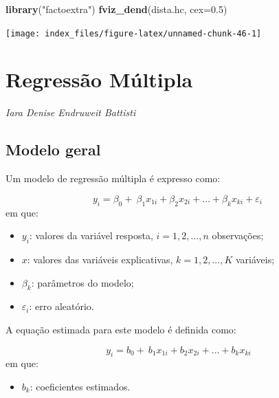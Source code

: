 \documentclass[12pt,brazil,oneside]{book}
\newenvironment{Shaded}{\begin{snugshade}}{\end{snugshade}}
\newcommand{\DataTypeTok}[1]{\textcolor[rgb]{0.13,0.29,0.53}{#1}}
\newcommand{\FloatTok}[1]{\textcolor[rgb]{0.00,0.00,0.81}{#1}}
\newcommand{\KeywordTok}[1]{\textcolor[rgb]{0.13,0.29,0.53}{\textbf{#1}}}
\newcommand{\NormalTok}[1]{#1}
\newcommand{\StringTok}[1]{\textcolor[rgb]{0.31,0.60,0.02}{#1}}
\providecommand{\tightlist}{%
  \setlength{\itemsep}{0pt}\setlength{\parskip}{0pt}}
\begin{document}
\begin{Shaded}
\begin{Highlighting}[]
\KeywordTok{library}\NormalTok{(}\StringTok{"factoextra"}\NormalTok{)}
\KeywordTok{fviz_dend}\NormalTok{(dista.hc, }\DataTypeTok{cex=}\FloatTok{0.5}\NormalTok{)}
\end{Highlighting}
\end{Shaded}

\begin{center}\texttt{[image: index\_files/figure-latex/unnamed-chunk-46-1]} \end{center}

\hypertarget{regressao-multipla}{%
\chapter{Regressão Múltipla}\label{regressao-multipla}}

\emph{Iara Denise Endruweit Battisti}

\begin{flushright}
\emph{}
\end{flushright}

\hypertarget{modelo-geral}{%
\section{Modelo geral}\label{modelo-geral}}

Um modelo de regressão múltipla é expresso como:

\[ 
y_{i} = \beta_0+\ \beta_1x_{1i}+\beta_2x_{2i}+\dots+\beta_kx_{ki}+\varepsilon_i\ 
\]
\noindent
em que:

\begin{itemize}
\item
  \(y_{i}\): valores da variável resposta, \(i = 1, 2,..., n\) observações;
\item
  \(x\): valores das variáveis explicativas, \(k = 1, 2,..., K\) variáveis;
\item
  \(\beta_k\): parâmetros do modelo;
\item
  \(\varepsilon_i\): erro aleatório.
\end{itemize}

A equação estimada para este modelo é definida como:

\[ 
y_{i} = b_0+\ b_1x_{1i}+b_2x_{2i}+\dots+b_kx_{ki} 
\]
em que:

\begin{itemize}
\tightlist
\item
  \(b_k\): coeficientes estimados.
\end{itemize}
\end{document}
